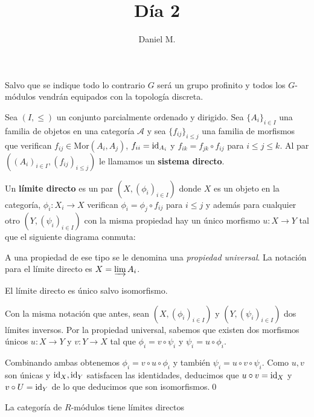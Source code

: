 \documentclass[a4paper,12pt, leqno]{article}
\title{Día 2}
\author{Daniel M.}
\begin{document}
\maketitle
Salvo que se indique todo lo contrario $G$ será un grupo profinito y todos los $G$-módulos vendrán equipados con la topología discreta. 
\begin{definicion} 
	Sea $(I,\leq)$ un conjunto parcialmente ordenado y dirigido. Sea $\{A_i\}_{i \in I}$ una familia de objetos en una categoría $\mathcal{A}$ y sea $\{f_{ij}\}_{i\leq j}$ una familia de morfismos que verifican $f_{ij}\in \mathrm{Mor}(A_i,A_j)$, $f_{ii}=\mathrm{id}_{A_i}$ y $f_{ik}=f_{jk}\circ f_{ij}$ para $i\leq j \leq k$. Al par $((A_i)_{i \in I}, (f_{ij})_{i\leq j})$ le llamamos un \textbf{sistema directo}.
	
	Un \textbf{límite directo} es un par $(X,(\phi_i)_{i\in I})$ donde $X$ es un objeto en la categoría, $\phi_i: X_i \rightarrow X$ verifican $\phi_i = \phi_j \circ f_{ij}$ para $i \leq j$ y además para cualquier otro $(Y,(\psi_i)_{i\in I})$ con la misma propiedad hay un único morfismo $u:X \rightarrow Y$ tal que el siguiente diagrama conmuta: 

	\begin{center}
	\end{center}
A una propiedad de ese tipo se le denomina una \textit{propiedad universal}. La notación para el límite directo es $X=\varinjlim A_i$.
\end{definicion}
\begin{prop}
	El límite directo es único salvo isomorfismo. 
\end{prop}
\begin{dem}
	
	
	Con la misma notación que antes, sean $(X,(\phi_i)_{i\in I})$ y $(Y,(\psi_i)_{i\in I})$ dos límites inversos. Por la propiedad universal, sabemos que existen dos morfismos únicos $u:X \rightarrow Y$ y $v:Y \rightarrow X$ tal que $\phi_i=v \circ \psi_i$ y $\psi_i = u \circ \phi_i$.
	
	Combinando ambas obtenemos $\phi_i=v \circ u \circ \phi_i$ y también $\psi_i = u \circ v \circ \psi_i$. Como $u,v$ son únicas y $\mathrm{id}_X,\mathrm{id}_Y$ satisfacen las identidades, deducimos que $u\circ v=\mathrm{id}_X$ y $v \circ U = \mathrm{id}_Y$ de lo que deducimos que son isomorfismos.\qed
\end{dem}	
\begin{prop}
La categoría de $R$-módulos tiene límites directos	
\end{prop}
\end{document}
